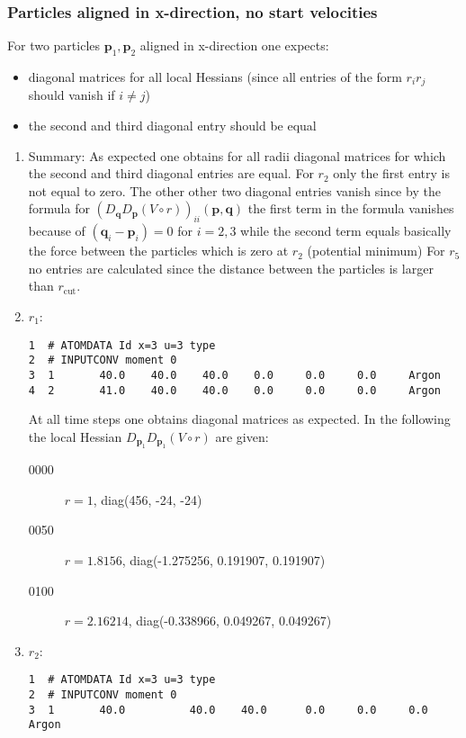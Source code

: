 \documentclass[a4paper]{article}
\newcommand{\boldp}{\boldsymbol{p}}
\newcommand{\boldq}{\boldsymbol{q}}
\begin{document}
\subsubsection{Particles aligned in x-direction, no start velocities}
\label{sec-1-4-1}
For two particles \(\boldp_1, \boldp_2\) aligned in x-direction one expects:
\begin{itemize}
\item diagonal matrices for all local Hessians (since all entries of the form \(r_i r_j\) should vanish if \(i \neq j\))
\item the second and third diagonal entry should be equal
\end{itemize}
\begin{enumerate}
\item Summary:
\label{sec-1-4-1-1}
As expected one obtains for all radii diagonal matrices for which the second and third diagonal entries are equal.
For \(r_2\) only the first entry is not equal to zero. The other other two diagonal entries vanish since by the formula for \((D_{\boldq}D_{\boldp} (V\circ r))_{ii}(\boldp, \boldq)\)
the first term in the formula vanishes because of \((\boldq_i - \boldp_i) = 0\)  for \(i = 2, 3\) while the second term equals basically the force between the particles which is zero at \(r_2\) (potential minimum)
For \(r_5\) no entries are calculated since the distance between the particles is larger than \(r_{\textrm{cut}}\).
\item \(r_1\):
\label{sec-1-4-1-2}
\begin{verbatim}
1  # ATOMDATA Id x=3 u=3 type
2  # INPUTCONV moment 0
3  1       40.0    40.0    40.0    0.0     0.0     0.0     Argon
4  2       41.0    40.0    40.0    0.0     0.0     0.0     Argon
\end{verbatim}
At all time steps one obtains diagonal matrices as expected.
In the following the local Hessian \(D_{\boldp_1} D_{\boldp_1} (V\circ r)\) are given:
\begin{description}
\item[{0000}] \(r = 1\), diag(456, -24, -24)
\item[{0050}] \(r = 1.8156\), diag(-1.275256, 0.191907, 0.191907)
\item[{0100}] \(r = 2.16214\), diag(-0.338966, 0.049267, 0.049267)
\end{description}
\item \(r_2\):
\label{sec-1-4-1-3}
\begin{verbatim}
1  # ATOMDATA Id x=3 u=3 type
2  # INPUTCONV moment 0
3  1       40.0          40.0    40.0      0.0     0.0     0.0     Argon

\end{verbatim}
\end{enumerate}
\end{document}
